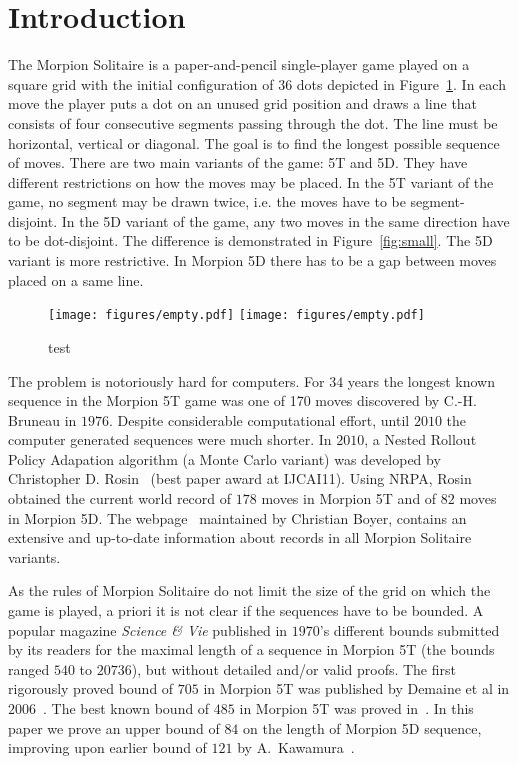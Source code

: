 \documentclass[a4paper,UKenglish]{lipics}
\begin{document}
\section{Introduction}
The Morpion Solitaire is a paper-and-pencil single-player game played on a square grid with 
  the initial configuration of 36 dots depicted in Figure~\ref{fig:initial}. 
In each move the player puts a dot on an unused grid position and draws a line that 
  consists of four consecutive segments passing through the dot. 
The line must be horizontal, vertical or diagonal. 
The goal is to find the longest possible sequence of moves.
There are two main variants of the game: 5T and 5D. 
They have different restrictions on how the moves may be placed.
In the 5T variant of the game, no segment may be drawn twice, i.e. the moves have to be segment-disjoint. 
In the 5D variant of the game, any two moves in the same direction have to be dot-disjoint.
The difference is demonstrated in Figure~\ref{fig:small}.
The 5D variant is more restrictive. In Morpion 5D there has to be a gap between moves
  placed on a same line.


  \begin{figure}
    \centering
      \texttt{[image: figures/empty.pdf]}
      \texttt{[image: figures/empty.pdf]}
      \caption{\label{fig:initial}
	test
      }
\end{figure}

The problem is notoriously hard for computers. 
For $34$ years the longest known sequence in the Morpion 5T game
  was one of 170 moves discovered by C.-H. Bruneau in $1976$. 
Despite considerable computational effort, until $2010$ the computer generated
  sequences were much shorter.
In $2010$, a Nested Rollout Policy Adapation algorithm (a Monte Carlo variant) 
  was developed by Christopher D. Rosin~\cite{rosin} (best paper award at IJCAI11).
Using NRPA, Rosin obtained the current world record of $178$ moves in Morpion 5T 
  and of $82$ moves in Morpion 5D.
The webpage~\cite{} maintained by Christian Boyer, contains an extensive and up-to-date information about records in all Morpion Solitaire variants.

As the rules of Morpion Solitaire do not limit the size of the grid on which the game is played, a priori
  it is not clear if the sequences have to be bounded.
A popular magazine \emph{Science \& Vie} published in $1970$'s different bounds submitted by its readers 
  for the maximal length of a sequence in Morpion 5T
  (the bounds ranged $540$ to $20736$), but without detailed and/or valid proofs.
The first rigorously proved bound of $705$ in Morpion 5T was published by Demaine et al in $2006$~\cite{}.
The best known bound of $485$ in Morpion 5T was proved in~\cite{}.
In this paper we prove an upper bound of $84$ on the length of Morpion 5D sequence, improving upon earlier bound of $121$ by A.~Kawamura~\cite{}.
\end{document}
